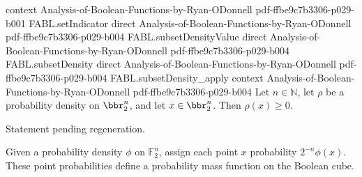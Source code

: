 \begin{theorem}
  {context}
  {Analysis-of-Boolean-Functions-by-Ryan-ODonnell}
  {pdf-ffbe9c7b3306-p029-b001}
\proofstep
  {FABL.setIndicator}
  {direct}
  {Analysis-of-Boolean-Functions-by-Ryan-ODonnell}
  {pdf-ffbe9c7b3306-p029-b004}
\proofstep
  {FABL.subsetDensityValue}
  {direct}
  {Analysis-of-Boolean-Functions-by-Ryan-ODonnell}
  {pdf-ffbe9c7b3306-p029-b004}
\proofstep
  {FABL.subsetDensity}
  {direct}
  {Analysis-of-Boolean-Functions-by-Ryan-ODonnell}
  {pdf-ffbe9c7b3306-p029-b004}
\proofstep
  {FABL.subsetDensity_apply}
  {context}
  {Analysis-of-Boolean-Functions-by-Ryan-ODonnell}
  {pdf-ffbe9c7b3306-p029-b004}
Let $n\in\mathbb N$, let $\rho$ be a probability density on $\bbr_2^n$, and let
$x\in\bbr_2^n$. Then $\rho(x)\ge 0$.
\end{theorem}

\begin{theorem}
\label{FABL.ProbabilityDensity.expect_eq_one}
\leanok
{}
Statement pending regeneration.
\end{theorem}

\begin{definition}
\label{FABL.ProbabilityDensity.toPMF}
\leanok
{}
Given a probability density $\phi$ on $\mathbb{F}_2^n$, assign each point $x$
probability $2^{-n}\phi(x)$. These point probabilities define a probability mass
function on the Boolean cube.
\end{definition}


